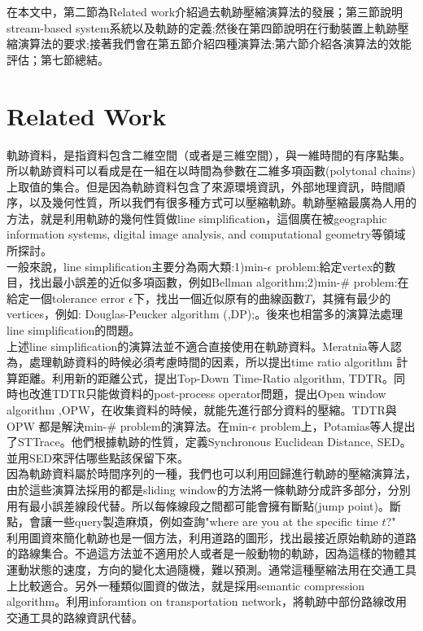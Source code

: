 \documentclass[12pt]{article}
\begin{document}
\begin{CJK}{UTF8}{bsmi}
在本文中，第二節為Related work介紹過去軌跡壓縮演算法的發展；第三節說明stream-based system系統以及軌跡的定義;然後在第四節說明在行動裝置上軌跡壓縮演算法的要求;接著我們會在第五節介紹四種演算法;第六節介紹各演算法的效能評估；第七節總結。
\section{Related Work}

軌跡資料，是指資料包含二維空間（或者是三維空間），與一維時間的有序點集。所以軌跡資料可以看成是在一組在以時間為參數在二維多項函數(polytonal chains)上取值的集合。但是因為軌跡資料包含了來源環境資訊，外部地理資訊，時間順序，以及幾何性質，所以我們有很多種方式可以壓縮軌跡。軌跡壓縮最廣為人用的方法，就是利用軌跡的幾何性質做line simplification，這個廣在被geographic information systems, digital image analysis, and computational geometry等領域所探討。\\

一般來說，line simplification主要分為兩大類:1)min-$\epsilon$ problem:給定vertex的數目，找出最小誤差的近似多項函數，例如Bellman algorithm\cite{1961:Bellman};2)min-$\#$ problem:在給定一個tolerance error $\epsilon$下，找出一個近似原有的曲線函數$T$，其擁有最少的vertices，例如:
Douglas-Peucker algorithm (,DP)\cite{1973:DP};。後來也相當多的演算法\cite{1992:AlgoAndCom_Appro}\cite{2000:Agarwal_Varadarajan}處理line simplification的問題。\\

上述line simplification的演算法並不適合直接使用在軌跡資料。Meratnia\cite{2004:TDTROPW}等人認為，處理軌跡資料的時候必須考慮時間的因素，所以提出time ratio algorithm 計算距離。利用新的距離公式，提出Top-Down Time-Ratio algorithm, TDTR。同時也改進TDTR只能做資料的post-process operator問題，提出Open window algorithm ,OPW，在收集資料的時候，就能先進行部分資料的壓縮。TDTR與OPW 都是解決min-$\#$ problem的演算法。在min-$\epsilon$ problem上，Potamias等人提出了STTrace\cite{2006:STTrace}。他們根據軌跡的性質，定義Synchronous Euclidean Distance, SED。並用SED來評估哪些點該保留下來。\\

因為軌跡資料屬於時間序列的一種，我們也可以利用回歸進行軌跡的壓縮演算法\cite{2004:ICDE_lineregress}\cite{2001:ICDM_lineReg}，由於這些演算法採用的都是sliding window的方法將一條軌跡分成許多部分，分別用有最小誤差線段代替。所以每條線段之間都可能會擁有斷點(jump point)。斷點，會讓一些query製造麻煩，例如查詢"where are you at the specific time $t$?"\\

利用圖資來簡化軌跡\cite{2005:ICDT_map1}\cite{2004:Map2}也是一個方法，利用道路的圖形，找出最接近原始軌跡的道路的路線集合。不過這方法並不適用於人或者是一般動物的軌跡，因為這樣的物體其運動狀態的速度，方向的變化太過隨機，難以預測。通常這種壓縮法用在交通工具上比較適合。另外一種類似圖資的做法，就是採用semantic compression algorithm\cite{2009:SSTD_Semantic}。利用inforamtion on transportation network，將軌跡中部份路線改用交通工具的路線資訊代替。\\



\end{CJK}
\end{document}
